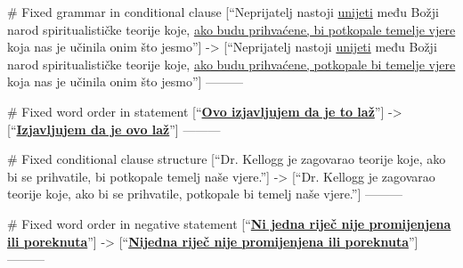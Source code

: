 # Fixed grammar in conditional clause
[“Neprijatelj nastoji \underline{unijeti} među Božji narod spiritualističke teorije koje, \underline{ako budu prihvaćene, bi potkopale temelje vjere} koja nas je učinila onim što jesmo”]
->
[“Neprijatelj nastoji \underline{unijeti} među Božji narod spiritualističke teorije koje, \underline{ako budu prihvaćene, potkopale bi temelje vjere} koja nas je učinila onim što jesmo”]
---------

# Fixed word order in statement
[“\textbf{\underline{Ovo izjavljujem da je to laž}}”]
->
[“\textbf{\underline{Izjavljujem da je ovo laž}}”]
---------

# Fixed conditional clause structure
[“Dr. Kellogg je zagovarao teorije koje, ako bi se prihvatile, bi potkopale temelj naše vjere.”]
->
[“Dr. Kellogg je zagovarao teorije koje, ako bi se prihvatile, potkopale bi temelj naše vjere.”]
---------

# Fixed word order in negative statement
[“\textbf{\underline{Ni jedna riječ nije promijenjena ili poreknuta}}”]
->
[“\textbf{\underline{Nijedna riječ nije promijenjena ili poreknuta}}”]
---------
